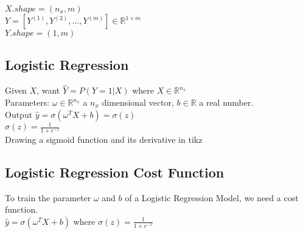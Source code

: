 \documentclass{article}
\begin{document}
$X.shape = (n_x, m)$\\

$Y = [Y^{(1)}, Y^{(2)}, \hdots, Y^{(m)}]
\in \mathbb{R}^{1 \times m}
$\\

$Y.shape = (1, m)$\\

\newpage
\subsection{Logistic Regression}

Given $X$, want $\hat{Y} = P(Y=1 |X)$ where $X \in \mathbb{R}^{n_x}$\\

    Parameters: $\omega \in \mathbb{R}^{n_x}$ a $n_x$ dimensional vector, $b \in \mathbb{R}$ a real number.\\

    Output $\hat{y} = \sigma(\omega^{T}X + b) = \sigma(z)$\\

$\displaystyle \sigma (z)=\frac {1}{1+e^{-z}}$\\

Drawing a sigmoid function and its derivative in tikz\\

\pgfplotsset{compat=1.16}


\newpage
\subsection{Logistic Regression Cost Function}

To train the parameter $\omega$ and $b$ of a Logistic Regression Model, we need a cost function.\\

    $\hat{y} = \sigma{(\omega^{T}X + b)}$ where $\sigma(z) = \frac{1}{1+e^{-z}}$\\
\end{document}
